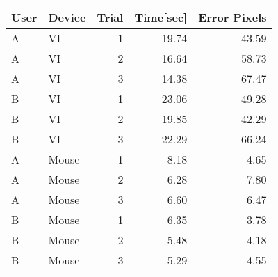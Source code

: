 \begin{tabular}{llrrr}
 \toprule
 User & Device & Trial & Time[sec] & Error Pixels \\
 \midrule
 A	& VI	  & 1	& 19.74	& 43.59 \\
 A	& VI	  & 2	& 16.64	& 58.73 \\
 A	& VI	  & 3	& 14.38	& 67.47 \\
 B	& VI	  & 1	& 23.06	& 49.28 \\
 B	& VI	  & 2	& 19.85	& 42.29 \\
 B	& VI	  & 3	& 22.29	& 66.24 \\
 A	& Mouse	& 1	& 8.18	& 4.65  \\
 A	& Mouse	& 2	& 6.28	& 7.80  \\
 A	& Mouse	& 3	& 6.60	& 6.47  \\
 B	& Mouse	& 1	& 6.35	& 3.78  \\
 B	& Mouse	& 2	& 5.48	& 4.18  \\
 B	& Mouse	& 3	& 5.29	& 4.55  \\
 \bottomrule
\end{tabular}
